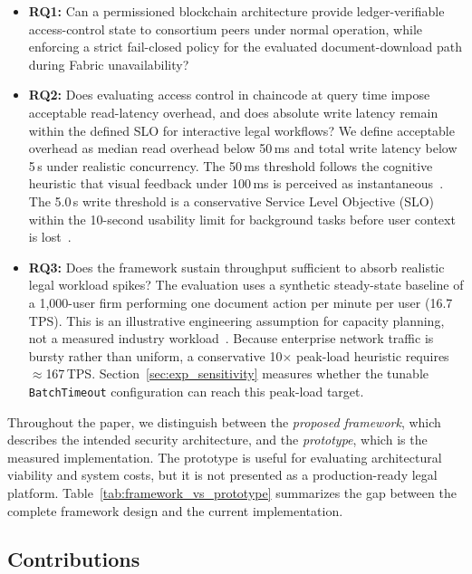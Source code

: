 \documentclass[preprint,12pt]{elsarticle}
\begin{document}
\begin{itemize}
\item \textbf{RQ1:} Can a permissioned blockchain architecture provide
ledger-verifiable access-control state to consortium peers under normal
operation, while enforcing a strict fail-closed policy for the evaluated
document-download path during Fabric unavailability?

\item \textbf{RQ2:} Does evaluating access control in chaincode at query time
impose acceptable read-latency overhead, and does absolute write latency remain
within the defined \textsc{SLO} for interactive legal workflows? We define
acceptable overhead as median read overhead below 50\,ms and total write
latency below 5\,s under realistic concurrency. The 50\,ms threshold follows
the cognitive heuristic that visual feedback under 100\,ms is perceived as
instantaneous~\cite{nielsen1993usability, miller1968response}. The 5.0\,s
write threshold is a conservative Service Level Objective (SLO) within the
10-second usability limit for background tasks before user context is
lost~\cite{nielsen1993usability}.

\item \textbf{RQ3:} Does the framework sustain throughput sufficient to absorb
realistic legal workload spikes? The evaluation uses a synthetic steady-state
baseline of a 1,000-user firm performing one document action per minute per
user (16.7\,TPS). This is an illustrative engineering assumption for capacity
planning, not a measured industry workload~\cite{aba2023,ilta2023}. Because
enterprise network traffic is bursty rather than uniform, a conservative
10$\times$ peak-load heuristic requires $\approx$167\,TPS. Section~\ref{sec:exp_sensitivity}
measures whether the tunable \texttt{BatchTimeout} configuration can reach
this peak-load target.

\end{itemize}

Throughout the paper, we distinguish between the \emph{proposed
framework}, which describes the intended security architecture, and
the \emph{prototype}, which is the measured implementation. The
prototype is useful for evaluating architectural viability and system
costs, but it is not presented as a production-ready legal platform.
Table~\ref{tab:framework_vs_prototype} summarizes the gap between
the complete framework design and the current implementation.

\subsection{Contributions}
\label{sec:contributions}
\end{document}
